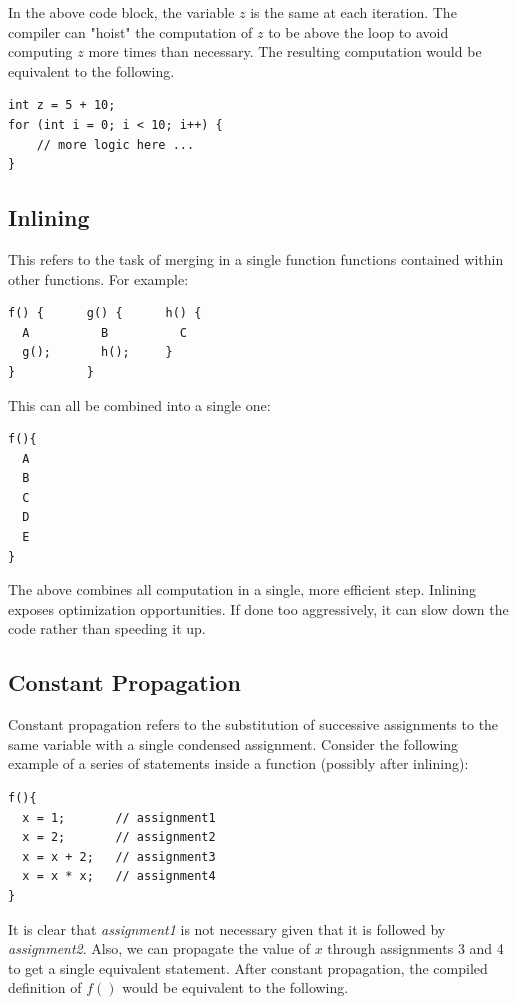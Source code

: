 \documentclass[twoside]{article}
\begin{document}
In the above code block, the variable $z$ is the same at each iteration. The compiler can "hoist" the computation of $z$ to be above the loop to avoid computing $z$ more times than necessary. The resulting computation would be equivalent to the following.

\begin{verbatim}
int z = 5 + 10;
for (int i = 0; i < 10; i++) {
    // more logic here ...
}
\end{verbatim}

\subsection{Inlining}
This refers to the task of merging in a single function functions contained within other functions. For example:

\begin{verbatim}
f() {      g() {      h() {
  A          B          C
  g();       h();     }
}          }
\end{verbatim}

This can all be combined into a single one:

\begin{verbatim}
f(){
  A
  B
  C
  D
  E
}
\end{verbatim}

The above combines all computation in a single, more efficient step. Inlining exposes optimization opportunities. If done too aggressively, it can slow down the code rather than speeding it up. 

\subsection{Constant Propagation}

Constant propagation refers to the substitution of successive assignments to the same variable with a single condensed assignment. Consider the following example of a series of statements inside a function (possibly after inlining):

\begin{verbatim}
f(){
  x = 1;       // assignment1
  x = 2;       // assignment2
  x = x + 2;   // assignment3
  x = x * x;   // assignment4
}
\end{verbatim}

It is clear that \emph{assignment1} is not necessary given that it is followed by \emph{assignment2}. Also, we can propagate the value of $x$ through assignments 3 and 4 to get a single equivalent statement. After constant propagation, the compiled definition of $f()$ would be equivalent to the following.
\end{document}
